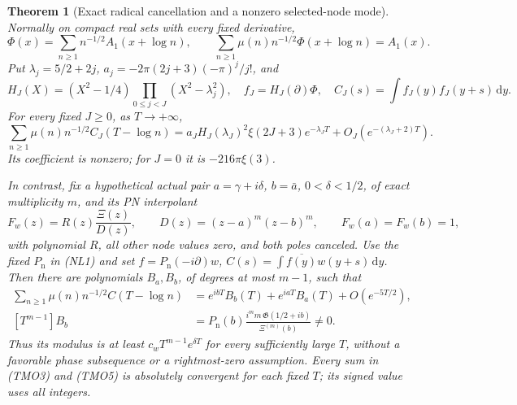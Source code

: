 \documentclass[11pt]{article}
\newtheorem{theorem}{Theorem}
\theoremstyle{remark}\newtheorem{remark}[theorem]{Remark}
\newcommand{\dd}{\,\mathrm d}
\begin{document}
\begin{theorem}[Exact radical cancellation and a nonzero selected-node mode]
\label{thm:theta-mobius-mode}
Normally on compact real sets with every fixed derivative,
\[
 \Phi(x)=\sum_{n\ge1}n^{-1/2}A_1(x+\log n),\qquad
 \sum_{n\ge1}\mu(n)n^{-1/2}\Phi(x+\log n)=A_1(x).                \tag{TMO2}
\]
Put \(\lambda_j=5/2+2j\),
\(a_j=-2\pi(2j+3)(-\pi)^j/j!\), and
\[
 H_J(X)=(X^2-1/4)\prod_{0\le j<J}(X^2-\lambda_j^2),\quad
 f_J=H_J(\partial)\Phi,\quad
 C_J(s)=\int f_J(y)f_J(y+s)\dd y .
\]
For every fixed \(J\ge0\), as \(T\to+\infty\),
\[
 \sum_{n\ge1}\mu(n)n^{-1/2}C_J(T-\log n)
 =a_JH_J(\lambda_J)^2\xi(2J+3)e^{-\lambda_JT}
                              +O_J(e^{-(\lambda_J+2)T}).       \tag{TMO3}
\]
Its coefficient is nonzero; for \(J=0\) it is
\(-216\pi\xi(3)\).

In contrast, fix a hypothetical actual pair
\(a=\gamma+i\delta\), \(b=\bar a\), \(0<\delta<1/2\), of
exact multiplicity \(m\), and its PN interpolant
\[
 F_w(z)=R(z)\frac{\Xi(z)}{D(z)},\qquad
 D(z)=(z-a)^m(z-b)^m,\qquad F_w(a)=F_w(b)=1,                   \tag{TMO4}
\]
with polynomial \(R\), all other node values zero, and both
poles canceled. Use the fixed \(P_{\mathrm n}\) in (NL1) and set
\(f=P_{\mathrm n}(-i\partial)w\),
\(C(s)=\int\overline{f(y)}w(y+s)\dd y\).
Then there are polynomials \(B_a,B_b\), of degrees at most
\(m-1\), such that
\[
 \begin{split}
 \sum_{n\ge1}\mu(n)n^{-1/2}C(T-\log n)
   &=e^{ibT}B_b(T)+e^{iaT}B_a(T)+O(e^{-5T/2}),\\
 [T^{m-1}]B_b
   &=P_{\mathrm n}(b)
          \frac{i^m m\,\mathfrak G(1/2+ib)}{\Xi^{(m)}(b)}
                       \ne0 .
 \end{split}                                                   \tag{TMO5}
\]
Thus its modulus is at least \(c_wT^{m-1}e^{\delta T}\)
for every sufficiently large \(T\), without a favorable
phase subsequence or a rightmost-zero assumption.
Every sum in (TMO3) and (TMO5) is absolutely convergent for
each fixed \(T\); its signed value uses all integers.
\end{theorem}
\end{document}
